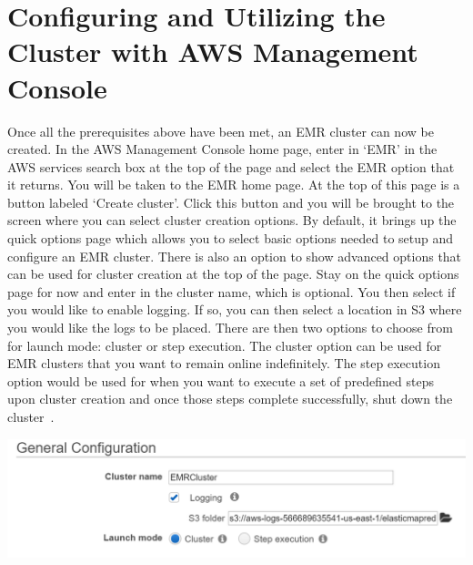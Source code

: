 \section{Configuring and Utilizing the Cluster with AWS Management Console}

Once all the prerequisites above have been met, an EMR cluster can now be 
created. In the AWS Management Console home page, enter in `EMR' in the AWS 
services search box at the top of the page and select the EMR option that it 
returns. You will be taken to the EMR home page. At the top of this page is 
a button labeled `Create cluster'. Click this button and you will be brought 
to the screen where you can select cluster creation options. By default, it 
brings up the quick options page which allows you to select basic options 
needed to setup and configure an EMR cluster. There is also an option to show 
advanced options that can be used for cluster creation at the top of the page. 
Stay on the quick options page for now and enter in the cluster name, which is 
optional. You then select if you would like to enable logging. If so, you can then 
select a location in S3 where you would like the logs to be placed. There are then 
two options to choose from for launch mode: cluster or step execution. The 
cluster option can be used for EMR clusters that you want to remain online 
indefinitely. The step execution option would be used for when you want to 
execute a set of predefined steps upon cluster creation and once those steps 
complete successfully, shut down the cluster~\cite{hid-sp18-521-emrlaunch}. 

\centering\includegraphics[width=\columnwidth]{../images/emr_gen_config.png}

